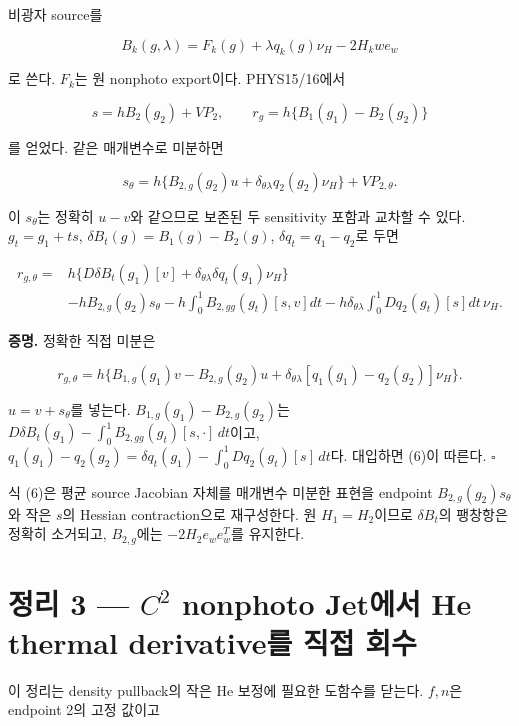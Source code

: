 비광자 source를

\[
B_k(g,\lambda)=F_k(g)+\lambda q_k(g)\nu_H-2H_kw e_w
\]

로 쓴다. \(F_k\)는 원 nonphoto export이다. PHYS15/16에서

\[
s=hB_2(g_2)+VP_2,\qquad
r_g=h\{B_1(g_1)-B_2(g_2)\}
\]

를 얻었다. 같은 매개변수로 미분하면

\[
\boxed{s_\theta=h\{B_{2,g}(g_2)u+\delta_{\theta\lambda}q_2(g_2)\nu_H\}+VP_{2,\theta}.}
\tag{5}
\]

이 \(s_\theta\)는 정확히 \(u-v\)와 같으므로 보존된 두 sensitivity 포함과 교차할 수 있다. \(g_t=g_1+ts\), \(\delta B_t(g)=B_1(g)-B_2(g)\), \(\delta q_t=q_1-q_2\)로 두면

\[
\boxed{\begin{aligned}
r_{g,\theta}={}&h\{D\delta B_t(g_1)[v]+\delta_{\theta\lambda}\delta q_t(g_1)\nu_H\}\\
&-hB_{2,g}(g_2)s_\theta
-h\int_0^1B_{2,gg}(g_t)[s,v]dt
-h\delta_{\theta\lambda}\int_0^1Dq_2(g_t)[s]dt\,\nu_H.
\end{aligned}}
\tag{6}
\]

\textbf{증명.} 정확한 직접 미분은

\[
r_{g,\theta}=h\{B_{1,g}(g_1)v-B_{2,g}(g_2)u
+\delta_{\theta\lambda}[q_1(g_1)-q_2(g_2)]\nu_H\}.
\]

\(u=v+s_\theta\)를 넣는다. \(B_{1,g}(g_1)-B_{2,g}(g_2)\)는 \(D\delta B_t(g_1)-\int_0^1B_{2,gg}(g_t)[s,\cdot]\,dt\)이고, \(q_1(g_1)-q_2(g_2)=\delta q_t(g_1)-\int_0^1Dq_2(g_t)[s]\,dt\)다. 대입하면 (6)이 따른다. \(\square\)

식 (6)은 평균 source Jacobian 자체를 매개변수 미분한 표현을 endpoint \(B_{2,g}(g_2)s_\theta\)와 작은 \(s\)의 Hessian contraction으로 재구성한다. 원 \(H_1=H_2\)이므로 \(\delta B_t\)의 팽창항은 정확히 소거되고, \(B_{2,g}\)에는 \(-2H_2e_we_w^T\)를 유지한다.

\hypertarget{uxc815uxb9ac-3-cuxb2-nonphoto-jetuxc5d0uxc11c-he-thermal-derivativeuxb97c-uxc9c1uxc811-uxd68cuxc218}{%
\section{정리 3 --- \texorpdfstring{\(C^2\)}{C2} nonphoto Jet에서 He thermal derivative를 직접 회수}\label{uxc815uxb9ac-3-cuxb2-nonphoto-jetuxc5d0uxc11c-he-thermal-derivativeuxb97c-uxc9c1uxc811-uxd68cuxc218}}

이 정리는 density pullback의 작은 He 보정에 필요한 도함수를 닫는다. \(f,n\)은 endpoint 2의 고정 값이고

